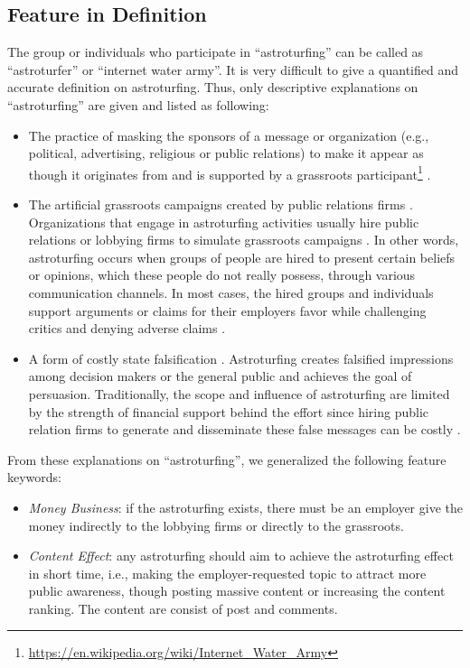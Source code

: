 \documentclass[lettersize,journal]{IEEEtran}
\begin{document}
\subsection{Feature in Definition}
The group or individuals who participate in ``astroturfing'' can be called as ``astroturfer'' or ``internet water army''. It is very difficult to give a quantified and accurate definition on astroturfing. Thus, only descriptive explanations on ``astroturfing'' are given and listed as following:
\begin{itemize}
\item The practice of masking the sponsors of a message or organization (e.g., political, advertising, religious or public relations) to make it appear as though it originates from and is supported by a grassroots participant\footnote{\url{https://en.wikipedia.org/wiki/Internet_Water_Army}} .

\item The artificial grassroots campaigns created by public relations firms \cite{Stauber1995Toxic}. Organizations that engage in astroturfing activities usually hire public relations or lobbying firms to simulate grassroots campaigns \cite{John2010Researching}. In other words, astroturfing occurs when groups of people are hired to present certain beliefs or opinions, which these people do not really possess, through various communication channels. In most cases, the hired groups and individuals support arguments or claims for their employers favor while challenging critics and denying adverse claims \cite{Cho2011Astroturfing}.

\item A form of costly state falsification \cite{Lyon2004Astroturf}. Astroturfing creates falsified impressions among decision makers or the general public and achieves the goal of persuasion. Traditionally, the scope and influence of astroturfing are limited by the strength of financial support behind the effort since hiring public relation firms to generate and disseminate these false messages can be costly \cite{Hoggan2010}.

\end{itemize}

From these explanations on ``astroturfing'', we generalized the following feature keywords:

\begin{itemize}
\item \emph{Money Business}: if the astroturfing exists, there must be an employer give the money indirectly to the lobbying firms or directly to the grassroots.
\item \emph{Content Effect}: any astroturfing should aim to achieve the astroturfing effect in short time, i.e., making the employer-requested topic to attract more public awareness, though posting massive content or increasing the content ranking. The content are consist of post and comments.
\end{itemize}
\end{document}
